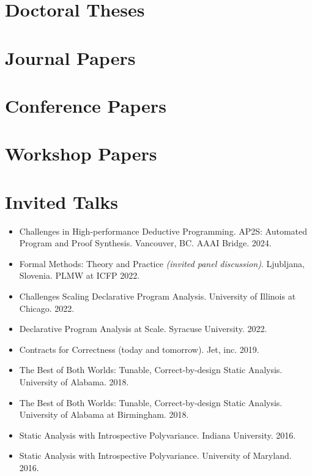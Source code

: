 \documentclass[line]{res}
\begin{document}
\begin{resume}
\section{\large Doctoral Theses} \vspace{0.3cm}

\vspace{-0.4cm}

\section{\large Journal Papers} \vspace{0.3cm}

\vspace{-0.4cm}

\section{\large Conference Papers} \vspace{0.3cm}

\vspace{-0.4cm}

\section{\large Workshop Papers} \vspace{0.3cm}

\vspace{-0.4cm}

\section{\large Invited Talks} \vspace{0.2in}
\begin{itemize}
\item Challenges in High-performance Deductive Programming. AP2S: Automated Program and Proof Synthesis. Vancouver, BC. AAAI Bridge. 2024. 
\item Formal Methods: Theory and Practice \textit{(invited panel discussion)}. Ljubljana, Slovenia. PLMW at ICFP 2022.
\item Challenges Scaling Declarative Program Analysis. University of Illinois at Chicago. 2022.
\item Declarative Program Analysis at Scale. Syracuse University. 2022.
\item Contracts for Correctness (today and tomorrow). Jet, inc. 2019.
\item The Best of Both Worlds: Tunable, Correct-by-design Static Analysis. University of Alabama. 2018.
\item The Best of Both Worlds: Tunable, Correct-by-design Static Analysis. University of Alabama at Birmingham. 2018.
\item Static Analysis with Introspective Polyvariance. Indiana University. 2016.
\item Static Analysis with Introspective Polyvariance. University of Maryland. 2016.
\end{itemize}


\end{resume}
\end{document}
